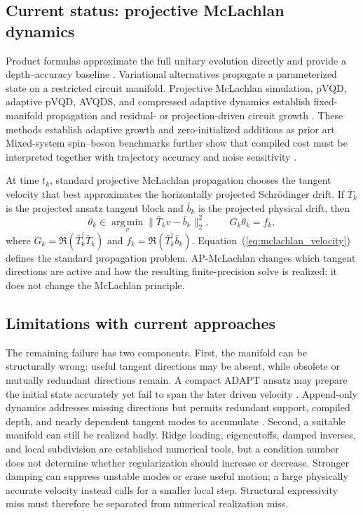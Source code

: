 \documentclass[
  reprint,
  amsmath,
  amssymb,
  aps,
  pra,
  nofootinbib,
  superscriptaddress,
  floatfix
]{revtex4-2}
\begin{document}
\subsection{Current status: projective McLachlan dynamics}
Product formulas approximate the full unitary evolution directly and provide a depth--accuracy baseline \cite{Suzuki1985,Suzuki1990,ChildsSu2019ProductFormula,ChildsOstranderSu2019RandomizedPF,Campbell2019QDRIFT}.  Variational alternatives propagate a parameterized state on a restricted circuit manifold.  Projective McLachlan simulation, pVQD, adaptive pVQD, AVQDS, and compressed adaptive dynamics establish fixed-manifold propagation and residual- or projection-driven circuit growth \cite{McLachlan1964,LiBenjamin2017VQS,Yuan2019VQS,Endo2020GeneralProcesses,Benedetti2021TimeEvolution,Barison2021,Yao2021,Linteau2024,Zhang2025}.  These methods establish adaptive growth and zero-initialized additions as prior art.  Mixed-system spin--boson benchmarks further show that compiled cost must be interpreted together with trajectory accuracy and noise sensitivity \cite{Miessen2021SpinBoson}.

At time \(t_k\), standard projective McLachlan propagation chooses the tangent velocity that best approximates the horizontally projected Schr\"odinger drift.  If \(\bar T_k\) is the projected ansatz tangent block and \(\bar b_k\) is the projected physical drift, then
\begin{equation}
\dot\theta_k
\in\operatorname*{arg\,min}_{v}
\|\bar T_kv-\bar b_k\|_2^2,
\qquad
G_k\dot\theta_k=f_k,
\label{eq:mclachlan_velocity}
\end{equation}
where \(G_k=\Re(\bar T_k^\dagger\bar T_k)\) and \(f_k=\Re(\bar T_k^\dagger\bar b_k)\).  Equation~(\ref{eq:mclachlan_velocity}) defines the standard propagation problem.  AP-McLachlan changes which tangent directions are active and how the resulting finite-precision solve is realized; it does not change the McLachlan principle.

\subsection{Limitations with current approaches}
The remaining failure has two components.  First, the manifold can be structurally wrong: useful tangent directions may be absent, while obsolete or mutually redundant directions remain.  A compact ADAPT ansatz may prepare the initial state accurately yet fail to span the later driven velocity \cite{Grimsley2019,Tang2021,Yordanov2021}.  Append-only dynamics addresses missing directions but permits redundant support, compiled depth, and nearly dependent tangent modes to accumulate \cite{Yao2021,Linteau2024,Zhang2025}.  Second, a suitable manifold can still be realized badly.  Ridge loading, eigencutoffs, damped inverses, and local subdivision are established numerical tools, but a condition number does not determine whether regularization should increase or decrease.  Stronger damping can suppress unstable modes or erase useful motion; a large physically accurate velocity instead calls for a smaller local step.  Structural expressivity miss must therefore be separated from numerical realization miss.
\end{document}
